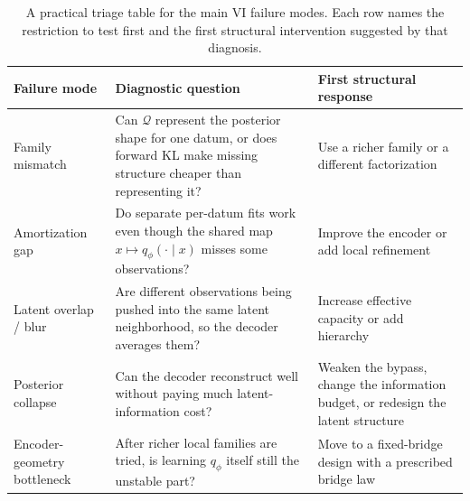\documentclass[11pt]{article}
\begin{document}
\begin{table}[t]
  \centering
  \small
  \setlength{\tabcolsep}{5pt}
  \renewcommand{\arraystretch}{1.12}
  \begin{tabular}{@{}p{}p{}p{}@{}}
    \toprule
    Failure mode & Diagnostic question & First structural response \\
    \midrule
    Family mismatch & Can \(\mathcal{Q}\) represent the posterior shape for one datum, or does forward KL make missing structure cheaper than representing it? & Use a richer family or a different factorization \\
    Amortization gap & Do separate per-datum fits work even though the shared map \(x\mapsto q_\phi(\cdot\mid x)\) misses some observations? & Improve the encoder or add local refinement \\
    Latent overlap / blur & Are different observations being pushed into the same latent neighborhood, so the decoder averages them? & Increase effective capacity or add hierarchy \\
    Posterior collapse & Can the decoder reconstruct well without paying much latent-information cost? & Weaken the bypass, change the information budget, or redesign the latent structure \\
    Encoder-geometry bottleneck & After richer local families are tried, is learning \(q_\phi\) itself still the unstable part? & Move to a fixed-bridge design with a prescribed bridge law \\
    \bottomrule
  \end{tabular}
  \caption{A practical triage table for the main VI failure modes.
  Each row names the restriction to test first and the first structural intervention suggested by that diagnosis.}
  \label{tab:vi-diagnostics}
\end{table}
\end{document}
